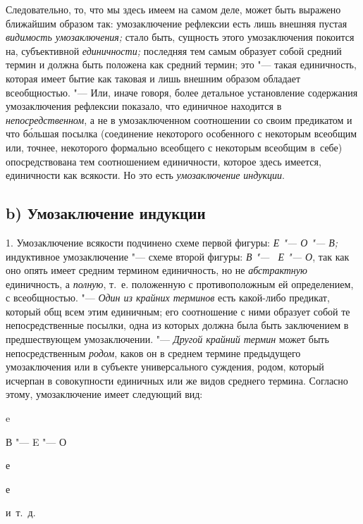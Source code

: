Следовательно, то, что мы здесь имеем на самом деле, может
быть выражено ближайшим образом так: умозаключение рефлексии есть лишь
внешняя пустая {\em видимость
умозаключения;} стало быть, сущность этого умозаключения
покоится на, субъективной {\em единичности;}
последняя тем самым образует собой средний термин и должна
быть положена как средний термин; это "--- такая единичность,
которая имеет бытие как таковая и лишь внешним образом обладает
всеобщностью. "--- Или, иначе говоря, более детальное
установление содержания умозаключения рефлексии показало, что единичное
находится в {\em непосредственном},
а не в умозаключенном соотношении со своим предикатом и что
б\'{о}льшая посылка (соединение некоторого особенного с некоторым всеобщим или,
точнее, некоторого формально всеобщего с некоторым всеобщим в~себе)
опосредствована тем соотношением единичности, которое здесь имеется,
единичности как всякости. Но это есть {\em умозаключение индукции}.

\subsection[b) Умозаключение индукции]{b) Умозаключение индукции}

1. Умозаключение всякости подчинено схеме первой фигуры:
{\em Е "--- О "--- В;} индуктивное умозаключение "--- схеме второй
фигуры: {\em В "--- ~Е "--- О}, так как оно опять имеет средним термином
единичность, но не {\em абстрактную} единичность, а {\em полную}, т.~е.
положенную с противоположным ей определением,
с всеобщностью. "--- {\em Один из крайних терминов} есть какой-либо предикат,
который общ всем этим единичным; его соотношение с ними образует собой
те непосредственные посылки, одна из которых должна была быть заключением
в предшествующем умозаключении. "--- {\em Другой крайний термин}
может быть непосредственным {\em родом}, каков он в среднем термине
предыдущего умозаключения или в субъекте универсального
суждения, родом, который исчерпан в совокупности единичных или же видов
среднего термина. Согласно этому, умозаключение имеет следующий вид:

{\centering
e
\par}

{\centering
В "--- E "--- О
\par}

{\centering
е
\par}

{\centering
е
\par}

{\centering
и~т.~д.
\par}

